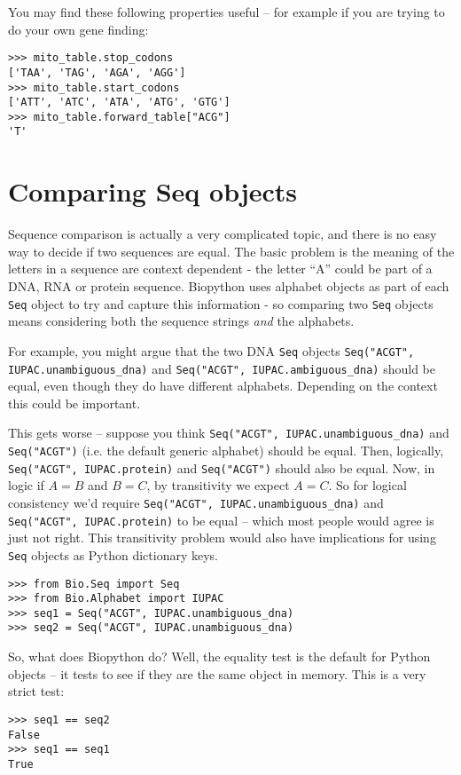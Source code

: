 \documentclass{report}
\begin{document}
You may find these following properties useful -- for example if you are trying
to do your own gene finding:
\begin{verbatim}
>>> mito_table.stop_codons
['TAA', 'TAG', 'AGA', 'AGG']
>>> mito_table.start_codons
['ATT', 'ATC', 'ATA', 'ATG', 'GTG']
>>> mito_table.forward_table["ACG"]
'T'
\end{verbatim}

\section{Comparing Seq objects}
\label{sec:seq-comparison}

Sequence comparison is actually a very complicated topic, and there is no easy
way to decide if two sequences are equal. The basic problem is the meaning of
the letters in a sequence are context dependent - the letter ``A'' could be part
of a DNA, RNA or protein sequence. Biopython uses alphabet objects as part of
each \verb|Seq| object to try and capture this information - so comparing two
\verb|Seq| objects means considering both the sequence strings \emph{and} the
alphabets.

For example, you might argue that the two DNA \verb|Seq| objects
\texttt{Seq("ACGT", IUPAC.unambiguous\_dna)} and
\texttt{Seq("ACGT", IUPAC.ambiguous\_dna)} should be equal, even though
they do have different alphabets. Depending on the context this could be
important.

This gets worse -- suppose you think \texttt{Seq("ACGT",
IUPAC.unambiguous\_dna)} and \texttt{Seq("ACGT")} (i.e. the default generic
alphabet) should be equal. Then, logically, \texttt{Seq("ACGT", IUPAC.protein)}
and \texttt{Seq("ACGT")} should also be equal. Now, in logic if $A=B$ and
$B=C$, by transitivity we expect $A=C$. So for logical consistency we'd
require \texttt{Seq("ACGT", IUPAC.unambiguous\_dna)} and \texttt{Seq("ACGT",
IUPAC.protein)} to be equal -- which most people would agree is just not right.
This transitivity problem would also have implications for using \verb|Seq|
objects as Python dictionary keys.

\begin{verbatim}
>>> from Bio.Seq import Seq
>>> from Bio.Alphabet import IUPAC
>>> seq1 = Seq("ACGT", IUPAC.unambiguous_dna)
>>> seq2 = Seq("ACGT", IUPAC.unambiguous_dna)
\end{verbatim}

So, what does Biopython do? Well, the equality test is the default for Python
objects -- it tests to see if they are the same object in memory. This is a
very strict test:
\begin{verbatim}
>>> seq1 == seq2
False
>>> seq1 == seq1
True
\end{verbatim}
\end{document}
